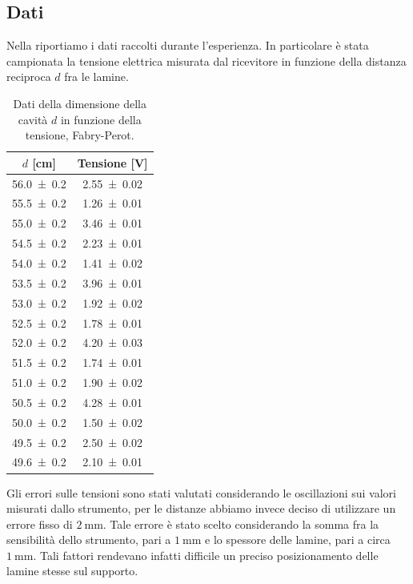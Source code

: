 \documentclass[a4paper]{article}
\begin{document}
\subsection{Dati}
Nella  riportiamo i dati raccolti durante l'esperienza. In particolare è stata campionata la tensione elettrica misurata dal ricevitore in funzione della distanza reciproca $d$ fra le lamine.
\begin{table}[H]
\centering
\caption{Dati della dimensione della cavità $d$ in funzione della tensione, Fabry-Perot.}
\label{tab:dati_Fabry_Perot}
\begin{tabular}{|c|c|}
\hline $d$ [\si{\centi\metre}] & Tensione [\si{\volt}] \\
\hline
\SI{56.0 \pm 0.2}{} & \SI{2.55 \pm 0.02}{} \\
\SI{55.5 \pm 0.2}{} & \SI{1.26 \pm 0.01}{} \\
\SI{55.0 \pm 0.2}{} & \SI{3.46 \pm 0.01}{} \\
\SI{54.5 \pm 0.2}{} & \SI{2.23 \pm 0.01}{} \\
\SI{54.0 \pm 0.2}{} & \SI{1.41 \pm 0.02}{} \\
\SI{53.5 \pm 0.2}{} & \SI{3.96 \pm 0.01}{} \\
\SI{53.0 \pm 0.2}{} & \SI{1.92 \pm 0.02}{} \\
\SI{52.5 \pm 0.2}{} & \SI{1.78 \pm 0.01}{} \\
\SI{52.0 \pm 0.2}{} & \SI{4.20 \pm 0.03}{} \\
\SI{51.5 \pm 0.2}{} & \SI{1.74 \pm 0.01}{} \\
\SI{51.0 \pm 0.2}{} & \SI{1.90 \pm 0.02}{} \\
\SI{50.5 \pm 0.2}{} & \SI{4.28 \pm 0.01}{} \\
\SI{50.0 \pm 0.2}{} & \SI{1.50 \pm 0.02}{} \\
\SI{49.5 \pm 0.2}{} & \SI{2.50 \pm 0.02}{} \\
\SI{49.6 \pm 0.2}{} & \SI{2.10 \pm 0.01}{} \\
\hline
\end{tabular}
\end{table}
Gli errori sulle tensioni sono stati valutati considerando le oscillazioni sui valori misurati dallo strumento, per le distanze abbiamo invece deciso di utilizzare un errore fisso di $\SI{2}{\milli\metre}$. Tale errore è stato scelto considerando la somma fra la sensibilità dello strumento, pari a $\SI{1}{\milli\metre}$ e lo spessore delle lamine, pari a circa $\SI{1}{\milli\metre}$. Tali fattori rendevano infatti difficile un preciso posizionamento delle lamine stesse sul supporto.
\end{document}

